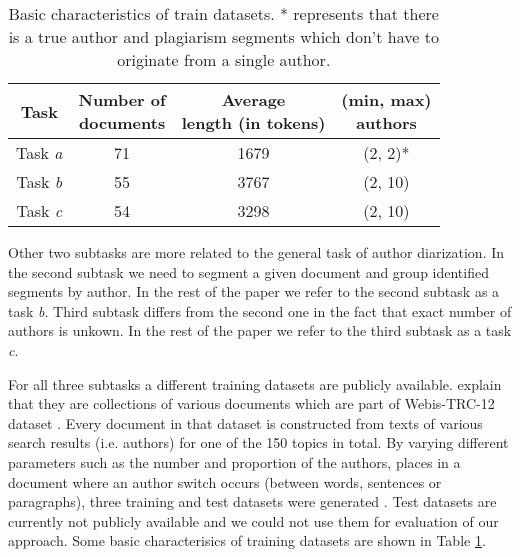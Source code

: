 \documentclass[10pt, a4paper]{article}
\begin{document}
\begin{table}
	\caption{Basic characteristics of train datasets. * represents that there is a true author and plagiarism segments which don't have to originate from a single author.}
	\label{table-1}
	\begin{center}
		\begin{tabular}{cccc}
			\toprule
			Task & \thead{Number of \\ documents} & \thead{Average \\ length (in tokens)} & \thead{(min, max)\\authors} \\
			\midrule
			Task \textit{a} & 71 & 1679 & (2, 2)*\\
			Task \textit{b} & 55 & 3767 & (2, 10)\\
			Task \textit{c} & 54 & 3298 & (2, 10)\\
			\bottomrule
		\end{tabular}
	\end{center}
\end{table}

Other two subtasks are more related to the general task of author diarization. In the second subtask we need to segment a given document and group identified segments by author. In the rest of the paper we refer to the second subtask as a task \textit{b}. Third subtask differs from the second one in the fact that exact number of authors is unkown. In the rest of the paper we refer to the third subtask as a task \textit{c}.

For all three subtasks a different training datasets are publicly available\footnotemark[1]. \citet{rosso-2016} explain that they are collections of various documents which are part of Webis-TRC-12 dataset \citep{potthast-2013}. Every document in that dataset is constructed from texts of various search results (i.e. authors) for one of the 150 topics in total. By varying different parameters such as the number and proportion of the authors, places in a document where an author switch occurs (between words, sentences or paragraphs), three training and test datasets were generated \citep{rosso-2016}. Test datasets are currently not publicly available and we could not use them for evaluation of our approach. Some basic characterisics of training datasets are shown in Table \ref{table-1}.

\end{document}
